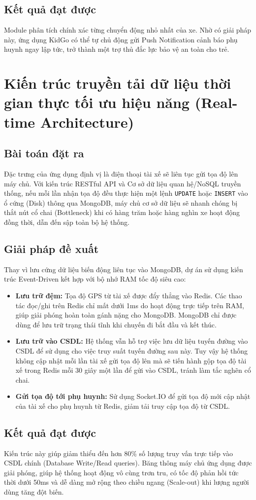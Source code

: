\documentclass[../DoAn.tex]{subfiles}
\begin{document}
\subsection{Kết quả đạt được}
Module phân tích chính xác từng chuyển động nhỏ nhất của xe. Nhờ có giải pháp này, ứng dụng KidGo có thể tự chủ động gửi Push Notification cảnh báo phụ huynh ngay lập tức, trở thành một trợ thủ đắc lực bảo vệ an toàn cho trẻ.

\section{Kiến trúc truyền tải dữ liệu thời gian thực tối ưu hiệu năng (Real-time Architecture)}
\subsection{Bài toán đặt ra}
Đặc trưng của ứng dụng định vị là điện thoại tài xế sẽ liên tục gửi tọa độ lên máy chủ. Với kiến trúc RESTful API và Cơ sở dữ liệu quan hệ/NoSQL truyền thống, nếu mỗi lần nhận tọa độ đều thực hiện một lệnh \texttt{UPDATE} hoặc \texttt{INSERT} vào ổ cứng (Disk) thông qua MongoDB, máy chủ cơ sở dữ liệu sẽ nhanh chóng bị thắt nút cổ chai (Bottleneck) khi có hàng trăm hoặc hàng nghìn xe hoạt động đồng thời, dẫn đến sập toàn bộ hệ thống.

\subsection{Giải pháp đề xuất}
Thay vì lưu cứng dữ liệu biến động liên tục vào MongoDB, dự án sử dụng kiến trúc Event-Driven kết hợp với bộ nhớ RAM tốc độ siêu cao:
\begin{itemize}
    \item \textbf{Lưu trữ đệm:} Tọa độ GPS từ tài xế được đẩy thẳng vào Redis. Các thao tác đọc/ghi trên Redis chỉ mất dưới 1ms do hoạt động trực tiếp trên RAM, giúp giải phóng hoàn toàn gánh nặng cho MongoDB. MongoDB chỉ được dùng để lưu trữ trạng thái tĩnh khi chuyến đi bắt đầu và kết thúc.
    \item \textbf{Lưu trữ vào CSDL:} Hệ thống vẫn hỗ trợ việc lưu dữ liệu tuyến đường vào CSDL để sử dụng cho việc truy suất tuyến đường sau này. Tuy vậy hệ thống không cập nhật mỗi lần tài xế gửi tọa độ lên mà sẽ tiến hành gộp tọa độ tài xế trong Redis mỗi 30 giây một lần để gửi vào CSDL, tránh làm tắc nghẽn cổ chai.
    \item \textbf{Gửi tọa độ tới phụ huynh:} Sử dụng Socket.IO để gửi tọa độ mới cập nhật của tài xế cho phụ huynh từ Redis, giảm tải truy cập tọa độ từ CSDL.
\end{itemize}

\subsection{Kết quả đạt được}
Kiến trúc này giúp giảm thiểu đến hơn 80\% số lượng truy vấn trực tiếp vào CSDL chính (Database Write/Read queries). Băng thông máy chủ ứng dụng được giải phóng, giúp hệ thống hoạt động vô cùng trơn tru, có tốc độ phản hồi tức thời dưới 50ms và dễ dàng mở rộng theo chiều ngang (Scale-out) khi lượng người dùng tăng đột biến.
\end{document}
